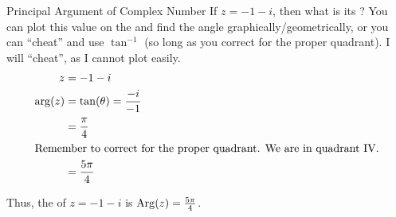 \begin{example}{Principal Argument of Complex Number}
  If $z = -1 - i$, then what is its \textbf{}?
  \tcblower{}
  You can plot this value on the  and find the angle graphically/geometrically, or you can ``cheat'' and use $\tan^{-1}$ (so long as you correct for the proper quadrant).
  I will ``cheat'', as I cannot plot easily.
  \begin{align*}
    z &= -1 - i \\
    \arg(z) &= \tan(\theta) = \frac{-i}{-1} \\
      &= \frac{\pi}{4} \\
    \shortintertext{Remember to correct for the proper quadrant. We are in quadrant IV.}
      &= \frac{5 \pi}{4} \\
  \end{align*}

  Thus, the  of $z = -1 - i$ is $\operatorname{Arg}(z) = \frac{5 \pi}{4}$.
\end{example}

